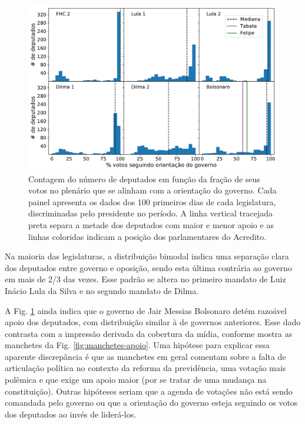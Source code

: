\documentclass[12pt,a4paper]{article}
\begin{document}
\begin{figure}[H]
\centering
\includegraphics[width=1.0\textwidth]{graficos/apoio_ao_governo_deputados_2019-04-30.pdf}
\caption{Contagem do número de deputados em função da fração de seus votos no plenário que se
  alinham com a orientação do governo. Cada painel apresenta os dados dos 100 primeiros dias de
  cada legislatura, discriminadas pelo presidente no período. A linha vertical tracejada preta
  separa a metade dos deputados com maior e menor apoio e as linhas coloridas indicam a posição
  dos parlamentares do Acredito.}
\label{fig:apoio-governo-deputados}
\end{figure}

Na maioria das legislaturas, a distribuição bimodal indica uma separação clara dos deputados
entre governo e oposição, sendo esta última contrária ao governo em mais de 2/3 das vezes.
Esse padrão se altera no primeiro mandato de Luiz Inácio Lula da Silva e no segundo mandato de Dilma.

A Fig. \ref{fig:apoio-governo-deputados} ainda indica que o governo de Jair Messias Bolsonaro detém
razoável apoio dos deputados, com distribuição similar à de governos anteriores. Esse dado contrasta
com a impressão derivada da cobertura da mídia, conforme mostra as manchetes da Fig. \ref{fig:manchetes-apoio}.
Uma hipótese para explicar essa aparente discrepância é que as manchetes em geral comentam sobre
a falta de articulação política no contexto da reforma da previdência, uma votação mais polêmica e
que exige um apoio maior (por se tratar de uma mudança na constituição). Outras hipóteses seriam
que a agenda de votações não está sendo comandada pelo governo ou que a orientação do governo esteja
seguindo os votos dos deputados ao invés de liderá-los.
\end{document}
